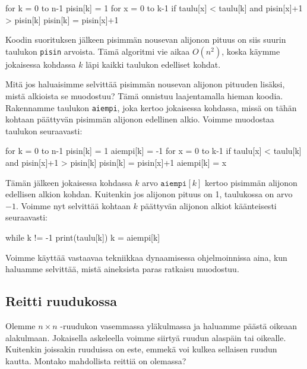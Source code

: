 \begin{code}
for k = 0 to n-1
    pisin[k] = 1
    for x = 0 to k-1
        if taulu[x] < taulu[k] and pisin[x]+1 > pisin[k]
            pisin[k] = pisin[x]+1
\end{code}

Koodin suorituksen jälkeen pisimmän nousevan alijonon pituus on
siis suurin taulukon \texttt{pisin} arvoista.
Tämä algoritmi vie aikaa $O(n^2)$, koska käym\-me jokaisessa
kohdassa $k$ läpi kaikki taulukon edelliset kohdat.

Mitä jos haluaisimme selvittää pisimmän nousevan alijonon
pituuden lisäksi, mistä alkioista se muodostuu?
Tämä onnistuu laajentamalla hieman koodia.
Rakennamme taulukon \texttt{aiempi},
joka kertoo jokaisessa kohdassa, missä on tähän kohtaan
päättyvän pisimmän alijonon edellinen alkio.
Voimme muodostaa taulukon seuraavasti:

\begin{code}
for k = 0 to n-1
    pisin[k] = 1
    aiempi[k] = -1
    for x = 0 to k-1
        if taulu[x] < taulu[k] and pisin[x]+1 > pisin[k]
            pisin[k] = pisin[x]+1
            aiempi[k] = x
\end{code}

Tämän jälkeen jokaisessa kohdassa $k$ arvo $\texttt{aiempi}[k]$
kertoo pisimmän alijonon edellisen alkion kohdan.
Kuitenkin jos alijonon pituus on 1, taulukossa on arvo $-1$.
Voimme nyt selvittää kohtaan $k$ päättyvän alijonon alkiot
käänteisesti seuraavasti:

\begin{code}
while k != -1
    print(taulu[k])
    k = aiempi[k]
\end{code}

Voimme käyttää vastaavaa tekniikkaa
dynaamisessa ohjelmoinnissa aina, kun haluamme
selvittää, mistä aineksista paras ratkaisu muodostuu.

\subsection{Reitti ruudukossa}

Olemme $n \times n$ -ruudukon vasemmassa yläkulmassa ja haluamme
päästä oikeaan alakulmaan.
Jokaisella askeleella voimme siirtyä ruudun alaspäin tai oikealle.
Kuitenkin joissakin ruuduissa on este, emmekä voi kulkea sellaisen
ruudun kautta.
Montako mahdollista reittiä on olemassa?


